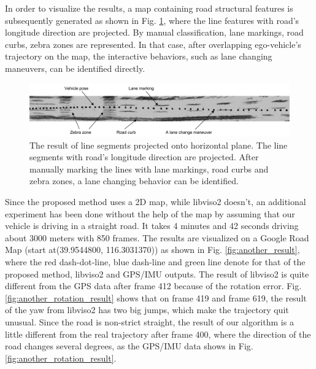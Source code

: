 \documentclass[letterpaper, 10 pt, conference]{ieeeconf}  %
\begin{document}
In order to visualize the results, a map containing road structural features is subsequently generated as shown in Fig. \ref{fig:lineProjection}, where the line features with road's longitude direction are projected. By manual classification, lane markings, road curbs, zebra zones are represented. In that case, after overlapping ego-vehicle's trajectory on the map, the interactive behaviors, such as lane changing maneuvers, can be identified directly.
\begin{figure}
\centering
\includegraphics[width=1\linewidth]{source//Final//horizon_line.pdf}
\caption{The result of line segments projected onto horizontal plane. The line segments with road's longitude direction are projected. After manually marking the lines with lane markings, road curbs and zebra zones, a lane changing behavior can be identified.}
\label{fig:lineProjection}
\end{figure}

Since the proposed method uses a 2D map, while libviso2 doesn't, an additional experiment has been done without the help of the map by assuming that our vehicle is driving in a straight road. It takes 4 minutes and 42 seconds driving about 3000 meters with 850 frames. The results are visualized on a Google Road Map (start at(39.9544800, 116.3031370)) as shown in Fig. \ref{fig:another_result}, where the red dash-dot-line, blue dash-line and green line denote for that of the proposed method, libviso2 and GPS/IMU outputs. The result of libviso2 is quite different from the GPS data after frame 412 because of the rotation error. Fig. \ref{fig:another_rotation_result} shows that on frame 419 and frame 619, the result of the yaw from libviso2 has two big jumps, which make the trajectory quit unusual. Since the road is non-strict straight, the result of our algorithm is a little different from the real trajectory after frame 400, where the direction of the road changes several degrees, as the GPS/IMU data shows in Fig. \ref{fig:another_rotation_result}.
\end{document}
